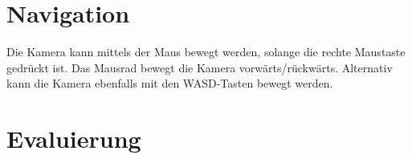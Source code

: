 \documentclass[a4paper,10pt]{article}
\begin{document}
\section*{Navigation}
Die Kamera kann mittels der Maus bewegt werden, solange die rechte Maustaste gedrückt ist. Das Mausrad bewegt die Kamera vorwärts/rückwärts. Alternativ kann die Kamera ebenfalls mit den WASD-Tasten bewegt werden.

\section*{Evaluierung}






\end{document}
